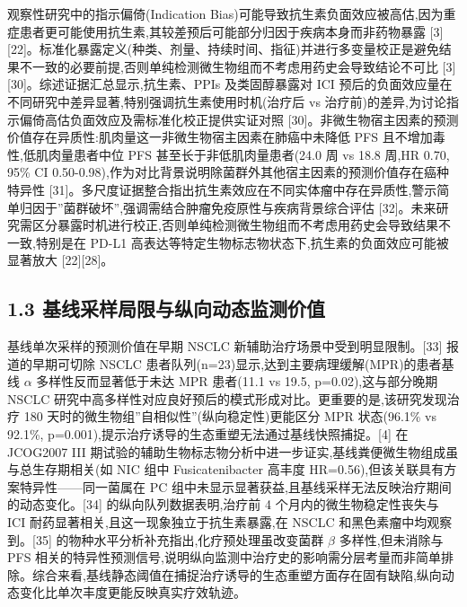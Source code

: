 观察性研究中的指示偏倚(Indication Bias)可能导致抗生素负面效应被高估,因为重症患者更可能使用抗生素,其较差预后可能部分归因于疾病本身而非药物暴露 {[}3{]}{[}22{]}。标准化暴露定义(种类、剂量、持续时间、指征)并进行多变量校正是避免结果不一致的必要前提,否则单纯检测微生物组而不考虑用药史会导致结论不可比 {[}3{]}{[}30{]}。综述证据汇总显示,抗生素、PPIs 及类固醇暴露对 ICI 预后的负面效应量在不同研究中差异显著,特别强调抗生素使用时机(治疗后 vs 治疗前)的差异,为讨论指示偏倚高估负面效应及需标准化校正提供实证对照 {[}30{]}。非微生物宿主因素的预测价值存在异质性:肌肉量这一非微生物宿主因素在肺癌中未降低 PFS 且不增加毒性,低肌肉量患者中位 PFS 甚至长于非低肌肉量患者(24.0 周 vs 18.8 周,HR 0.70, 95\% CI 0.50-0.98),作为对比背景说明除菌群外其他宿主因素的预测价值存在癌种特异性 {[}31{]}。多尺度证据整合指出抗生素效应在不同实体瘤中存在异质性,警示简单归因于''菌群破坏'',强调需结合肿瘤免疫原性与疾病背景综合评估 {[}32{]}。未来研究需区分暴露时机进行校正,否则单纯检测微生物组而不考虑用药史会导致结果不一致,特别是在 PD-L1 高表达等特定生物标志物状态下,抗生素的负面效应可能被显著放大 {[}22{]}{[}28{]}。

\subsection{1.3 基线采样局限与纵向动态监测价值}\label{ux57faux7ebfux91c7ux6837ux5c40ux9650ux4e0eux7eb5ux5411ux52a8ux6001ux76d1ux6d4bux4ef7ux503c}

基线单次采样的预测价值在早期 NSCLC 新辅助治疗场景中受到明显限制。{[}33{]} 报道的早期可切除 NSCLC 患者队列(n=23)显示,达到主要病理缓解(MPR)的患者基线 \(\alpha\) 多样性反而显著低于未达 MPR 患者(11.1 vs 19.5, p=0.02),这与部分晚期 NSCLC 研究中高多样性对应良好预后的模式形成对比。更重要的是,该研究发现治疗 180 天时的微生物组''自相似性''(纵向稳定性)更能区分 MPR 状态(96.1\% vs 92.1\%, p=0.001),提示治疗诱导的生态重塑无法通过基线快照捕捉。{[}4{]} 在 JCOG2007 III 期试验的辅助生物标志物分析中进一步证实,基线粪便微生物组成虽与总生存期相关(如 NIC 组中 Fusicatenibacter 高丰度 HR=0.56),但该关联具有方案特异性------同一菌属在 PC 组中未显示显著获益,且基线采样无法反映治疗期间的动态变化。{[}34{]} 的纵向队列数据表明,治疗前 4 个月内的微生物稳定性丧失与 ICI 耐药显著相关,且这一现象独立于抗生素暴露,在 NSCLC 和黑色素瘤中均观察到。{[}35{]} 的物种水平分析补充指出,化疗预处理虽改变菌群 \(\beta\) 多样性,但未消除与 PFS 相关的特异性预测信号,说明纵向监测中治疗史的影响需分层考量而非简单排除。综合来看,基线静态阈值在捕捉治疗诱导的生态重塑方面存在固有缺陷,纵向动态变化比单次丰度更能反映真实疗效轨迹。

